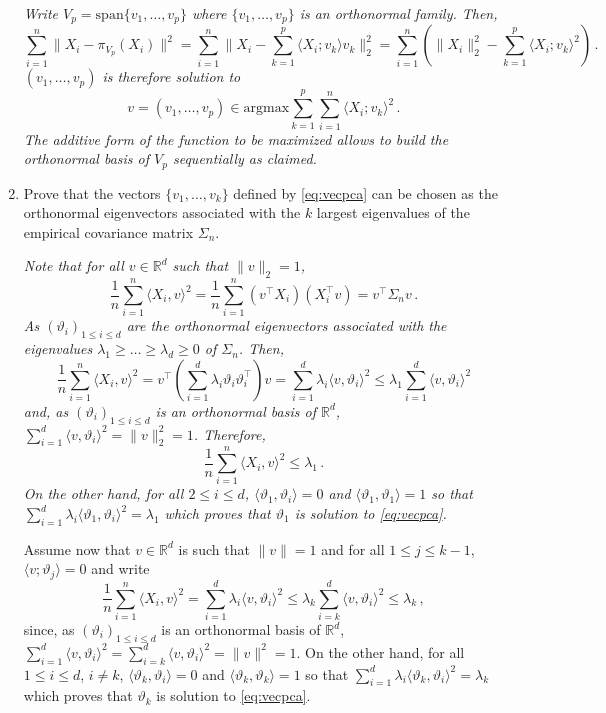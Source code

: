 \documentclass[a4paper,10pt,fleqn]{article}
\newcommand{\eqsp}{\,}
\newcommand{\rset}{\ensuremath{\mathbb{R}}}
\newcommand{\1}{\ensuremath{\mathbbm{1}}}
\newcommand{\bfs}{\Sigma}
\begin{document}
\begin{enumerate}
\vspace{.2cm}

{\em
Write $V_p = \mathrm{span}\{v_1,\ldots,v_p\}$ where $\{v_1,\ldots,v_p\}$ is an orthonormal family. Then,
$$
\sum_{i=1}^n\|X_i - \pi_{V_p}(X_i)\|^2  = \sum_{i=1}^n\|X_i -  \sum_{k=1}^p\langle X_i; v_k \rangle v_k \|_2^2= \sum_{i=1}^n \left( \|X_i\|_2^2 -  \sum_{k=1}^p \langle X_i; v_k \rangle^2 \right)\eqsp.
$$
 $(v_1,\ldots,v_p)$ is therefore solution to 
$$
v = (v_1,\ldots,v_p) \in \mathrm{argmax} \sum_{k=1}^p  \sum_{i=1}^n \langle X_i; v_k \rangle^2\eqsp.
$$
The additive form of the function to be maximized allows to build the orthonormal basis of $V_p$ sequentially as claimed.
}
\item Prove that the vectors $\{v_1, \ldots , v_k\}$ defined by \eqref{eq:vecpca} can be chosen as the orthonormal eigenvectors associated with the $k$ largest eigenvalues of the empirical covariance matrix $\bfs_n$.

\vspace{.2cm}

{\em
Note that for all $v\in \rset^d$ such that $\|v\|_2=1$,
$$
\frac{1}{n}\sum_{i=1}^n\langle X_i,v\rangle^2 = \frac{1}{n}\sum_{i=1}^n (v^\top X_i)(X^\top_iv) = v^\top\bfs_n v\eqsp.
$$
As $(\vartheta_i)_{1\leqslant i \leqslant d}$ are the orthonormal eigenvectors associated with the eigenvalues $\lambda_1\geqslant \ldots \geqslant\lambda_d\geqslant 0$ of $\Sigma_n$. Then,
$$
\frac{1}{n}\sum_{i=1}^n\langle X_i,v\rangle^2 = v^\top\left(\sum_{i=1}^d \lambda_i \vartheta_i\vartheta^\top_i\right)v = \sum_{i=1}^d \lambda_i \langle v,\vartheta_i\rangle^2\leqslant \lambda_1  \sum_{i=1}^d \langle v,\vartheta_i\rangle^2
$$
and, as $(\vartheta_i)_{1\leqslant i \leqslant d}$ is an orthonormal basis of $\rset^d$,  $\sum_{i=1}^d \langle v,\vartheta_i\rangle^2 = \|v\|_2^2 = 1$. Therefore,
$$
\frac{1}{n}\sum_{i=1}^n\langle X_i,v\rangle^2 \leqslant \lambda_1\eqsp.
$$
On the other hand, for all $2\leqslant i \leqslant d$, $\langle \vartheta_1,\vartheta_i\rangle =0$ and $\langle \vartheta_1,\vartheta_1\rangle=1$ so that $\sum_{i=1}^d \lambda_i \langle \vartheta_1,\vartheta_i\rangle^2 = \lambda_1$ which proves that $\vartheta_1$ is solution to \eqref{eq:vecpca}.

Assume now that  $v\in \rset^d$ is such that $\|v\|=1$ and for all $1\leqslant j \leqslant k-1$,  $\langle v ; \vartheta_j\rangle = 0$ and write
$$
\frac{1}{n}\sum_{i=1}^n\langle X_i,v\rangle^2 = \sum_{i=1}^d \lambda_i \langle v,\vartheta_i\rangle^2\le \lambda_k  \sum_{i=k}^d \langle v,\vartheta_i\rangle^2 \le \lambda_k\eqsp,
$$
since, as $(\vartheta_i)_{1\leqslant i \leqslant d}$ is an orthonormal basis of $\rset^d$,  $\sum_{i=1}^d \langle v,\vartheta_i\rangle^2 = \sum_{i=k}^d \langle v,\vartheta_i\rangle^2 = \|v\|^2 = 1$. On the other hand, for all $1\leqslant i \leqslant d$, $i\neq k$, $\langle \vartheta_k,\vartheta_i\rangle =0$ and $\langle \vartheta_k,\vartheta_k\rangle=1$ so that $\sum_{i=1}^d \lambda_i \langle \vartheta_k,\vartheta_i\rangle^2 = \lambda_k$ which proves that $\vartheta_k$ is solution to \eqref{eq:vecpca}.

}
\end{enumerate}
\end{document}
